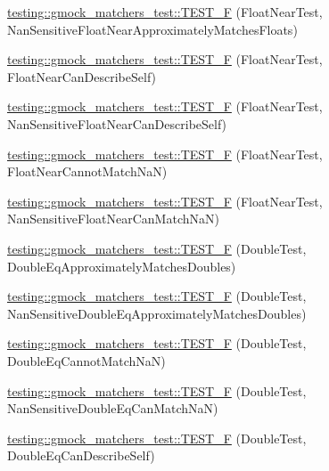 \begin{DoxyCompactItemize}
\item 
\mbox{\hyperlink{namespacetesting_1_1gmock__matchers__test_ad396e996ed685fd80cbd78740b8d01a8}{testing\+::gmock\+\_\+matchers\+\_\+test\+::\+T\+E\+S\+T\+\_\+F}} (Float\+Near\+Test, Nan\+Sensitive\+Float\+Near\+Approximately\+Matches\+Floats)
\item 
\mbox{\hyperlink{namespacetesting_1_1gmock__matchers__test_ad56232046efe7b4d5169a15fd15a2001}{testing\+::gmock\+\_\+matchers\+\_\+test\+::\+T\+E\+S\+T\+\_\+F}} (Float\+Near\+Test, Float\+Near\+Can\+Describe\+Self)
\item 
\mbox{\hyperlink{namespacetesting_1_1gmock__matchers__test_a4e90d53ea578d6b767559d8615a4c0c2}{testing\+::gmock\+\_\+matchers\+\_\+test\+::\+T\+E\+S\+T\+\_\+F}} (Float\+Near\+Test, Nan\+Sensitive\+Float\+Near\+Can\+Describe\+Self)
\item 
\mbox{\hyperlink{namespacetesting_1_1gmock__matchers__test_a2cd2ceebefa14a5d564a3bca60ed6572}{testing\+::gmock\+\_\+matchers\+\_\+test\+::\+T\+E\+S\+T\+\_\+F}} (Float\+Near\+Test, Float\+Near\+Cannot\+Match\+NaN)
\item 
\mbox{\hyperlink{namespacetesting_1_1gmock__matchers__test_ae7521865828fba53b45cc2819bec1273}{testing\+::gmock\+\_\+matchers\+\_\+test\+::\+T\+E\+S\+T\+\_\+F}} (Float\+Near\+Test, Nan\+Sensitive\+Float\+Near\+Can\+Match\+NaN)
\item 
\mbox{\hyperlink{namespacetesting_1_1gmock__matchers__test_a1b33dc485faca8c69184f3feb0476290}{testing\+::gmock\+\_\+matchers\+\_\+test\+::\+T\+E\+S\+T\+\_\+F}} (Double\+Test, Double\+Eq\+Approximately\+Matches\+Doubles)
\item 
\mbox{\hyperlink{namespacetesting_1_1gmock__matchers__test_ab100ee4a4b0340e31212fb43c9e28255}{testing\+::gmock\+\_\+matchers\+\_\+test\+::\+T\+E\+S\+T\+\_\+F}} (Double\+Test, Nan\+Sensitive\+Double\+Eq\+Approximately\+Matches\+Doubles)
\item 
\mbox{\hyperlink{namespacetesting_1_1gmock__matchers__test_a4c34f3f339de72d3f4f96a08a5125b59}{testing\+::gmock\+\_\+matchers\+\_\+test\+::\+T\+E\+S\+T\+\_\+F}} (Double\+Test, Double\+Eq\+Cannot\+Match\+NaN)
\item 
\mbox{\hyperlink{namespacetesting_1_1gmock__matchers__test_ab42c199ae0008ce7550f584742caec28}{testing\+::gmock\+\_\+matchers\+\_\+test\+::\+T\+E\+S\+T\+\_\+F}} (Double\+Test, Nan\+Sensitive\+Double\+Eq\+Can\+Match\+NaN)
\item 
\mbox{\hyperlink{namespacetesting_1_1gmock__matchers__test_a5975fb5a50e5364fe21422093680a559}{testing\+::gmock\+\_\+matchers\+\_\+test\+::\+T\+E\+S\+T\+\_\+F}} (Double\+Test, Double\+Eq\+Can\+Describe\+Self)

\end{DoxyCompactItemize}
